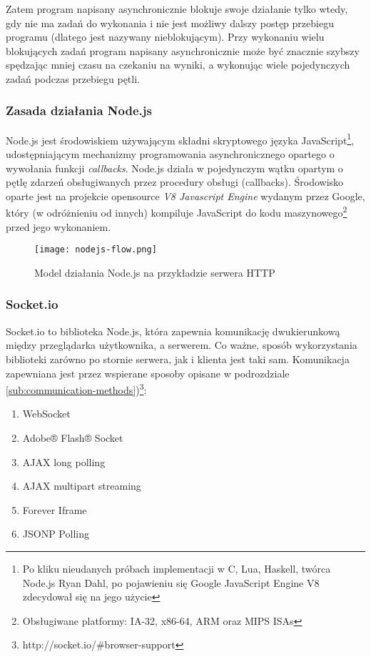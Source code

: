 Zatem program napisany asynchronicznie blokuje swoje działanie tylko wtedy, gdy nie ma zadań do wykonania i nie jest możliwy dalszy postęp przebiegu programu (dlatego jest nazywany nieblokującym). Przy wykonaniu wielu blokujących zadań program napisany asynchronicznie może być znacznie szybszy spędzając mniej czasu na czekaniu na wyniki, a wykonując wiele pojedynczych zadań podczas przebiegu pętli.

\subsubsection{Zasada działania Node.js}

Node.js jest środowiskiem używającym składni skryptowego języka JavaScript\footnote{Po kliku nieudanych próbach implementacji w C, Lua,  Haskell, twórca Node.js Ryan Dahl, po pojawieniu się Google JavaScript Engine V8 zdecydował się na jego użycie}, udostępniającym mechanizmy programowania asynchronicznego opartego o wywołania funkcji \emph{callbacks}. Node.js działa w pojedynczym wątku opartym o pętlę zdarzeń obsługiwanych przez procedury obsługi (callbacks). Środowisko oparte jest na projekcie opensource \emph{V8 Javascript Engine} wydanym przez Google, który (w odróżnieniu od innych) kompiluje JavaScript do kodu maszynowego\footnote{Obsługiwane platformy: IA-32, x86-64, ARM oraz MIPS ISAs} przed jego wykonaniem.

\begin{figure}[H]
  \caption[Model działania Node.js]{Model działania Node.js na przykładzie serwera HTTP}
  \centering
    \texttt{[image: nodejs-flow.png]}
\end{figure}

\subsubsection{Socket.io}
\label{subsub:socketio}

Socket.io to biblioteka Node.js, która zapewnia komunikację dwukierunkową między przeglądarka użytkownika, a serwerem. Co ważne, sposób wykorzystania biblioteki zarówno po stornie serwera, jak i klienta jest taki sam. Komunikacja zapewniana jest przez wspierane sposoby opisane w podrozdziale \ref{sub:communication-methods})\footnote{http://socket.io/\#browser-support}:

\begin{enumerate}
  \item WebSocket
  \item Adobe® Flash® Socket
  \item AJAX long polling
  \item AJAX multipart streaming
  \item Forever Iframe
  \item JSONP Polling
\end{enumerate}

